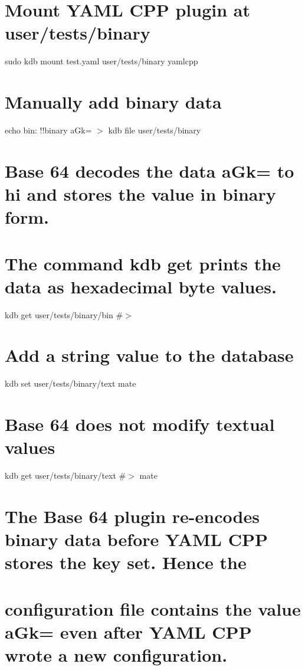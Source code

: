  \section*{Mount Y\+A\+ML C\+PP plugin at {\ttfamily user/tests/binary}}

sudo kdb mount test.\+yaml user/tests/binary yamlcpp \section*{Manually add binary data}

echo \textquotesingle{}bin\+: !!binary a\+Gk=\textquotesingle{} $>$ {\ttfamily kdb file user/tests/binary}

\section*{Base 64 decodes the data {\ttfamily a\+Gk=} to {\ttfamily hi} and stores the value in binary form.}

\section*{The command {\ttfamily kdb get} prints the data as hexadecimal byte values.}

kdb get user/tests/binary/bin \#$>$ 

\section*{Add a string value to the database}

kdb set user/tests/binary/text mate \section*{Base 64 does not modify textual values}

kdb get user/tests/binary/text \#$>$ mate

\section*{The Base 64 plugin re-\/encodes binary data before Y\+A\+ML C\+PP stores the key set. Hence the}

\section*{configuration file contains the value {\ttfamily a\+Gk=} even after Y\+A\+ML C\+PP wrote a new configuration.}

